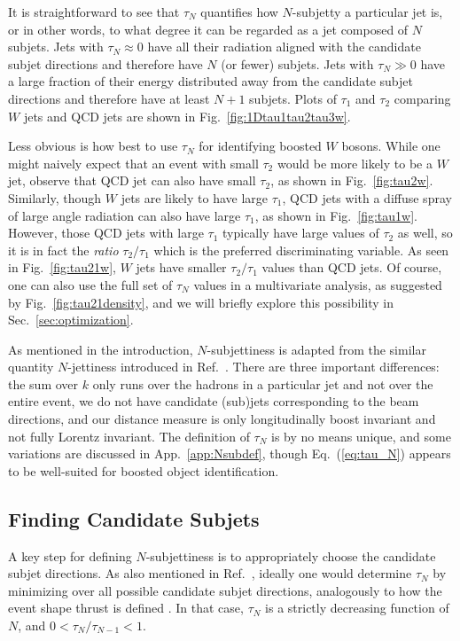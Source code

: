 \documentclass{JHEP3}
\DeclareRobustCommand{\Sec}[1]{Sec.~\ref{#1}}
\DeclareRobustCommand{\App}[1]{App.~\ref{#1}}
\DeclareRobustCommand{\Fig}[1]{Fig.~\ref{#1}}
\DeclareRobustCommand{\Eq}[1]{Eq.~(\ref{#1})}
\DeclareRobustCommand{\Ref}[1]{Ref.~\cite{#1}}
\begin{document}
It is straightforward to see that $\tau_N$ quantifies how $N$-subjetty a particular jet is, or in other words, to what degree it can be regarded as a jet composed of $N$ subjets.  Jets with $\tau_N \approx 0$ have all their radiation aligned with the candidate subjet directions and therefore have $N$ (or fewer) subjets.  Jets with $\tau_N \gg 0$ have a large fraction of their energy distributed away from the candidate subjet directions and therefore have at least $N+1$ subjets.  Plots of $\tau_1$ and $\tau_2$ comparing $W$ jets and QCD jets are shown in \Fig{fig:1Dtau1tau2tau3w}.

Less obvious is how best to use $\tau_N$ for identifying boosted $W$ bosons.  While one might naively expect that an event with small $\tau_2$ would be more likely to be a $W$ jet, observe that QCD jet can also have small $\tau_2$, as shown in \Fig{fig:tau2w}.  Similarly, though $W$ jets are likely to have large $\tau_1$, QCD jets with a diffuse spray of large angle radiation can also have large $\tau_1$, as shown in \Fig{fig:tau1w}.  However, those QCD jets with large $\tau_1$ typically have large values of $\tau_2$ as well, so it is in fact the \emph{ratio} $\tau_2/\tau_1$ which is the preferred discriminating variable.  As seen in \Fig{fig:tau21w}, $W$ jets have smaller $\tau_2/\tau_1$ values than QCD jets.  Of course, one can also use the full set of $\tau_N$ values in a multivariate analysis, as suggested by \Fig{fig:tau21density}, and we will briefly explore this possibility in \Sec{sec:optimization}.

As mentioned in the introduction, $N$-subjettiness is adapted from the similar quantity $N$-jettiness introduced in \Ref{Stewart:2010tn}.  There are three important differences:  the sum over $k$ only runs over the hadrons in a particular jet and not over the entire event, we do not have candidate (sub)jets corresponding to the beam directions, and our distance measure is only longitudinally boost invariant and not fully Lorentz invariant.  The definition of $\tau_N$ is by no means unique, and some variations are discussed in \App{app:Nsubdef}, though \Eq{eq:tau_N} appears to be well-suited for boosted object identification.  

\subsection{Finding Candidate Subjets}
\label{subsec:candidate_subjets}

A key step for defining $N$-subjettiness is to appropriately choose the candidate subjet directions.  As also mentioned in \Ref{Stewart:2010tn}, ideally one would determine $\tau_N$ by minimizing over all possible candidate subjet directions, analogously to how the event shape thrust is defined \cite{Farhi:1977sg}.  In that case, $\tau_N$ is a strictly decreasing function of $N$, and $0 < \tau_{N}/\tau_{N-1} < 1$.  
\end{document}
